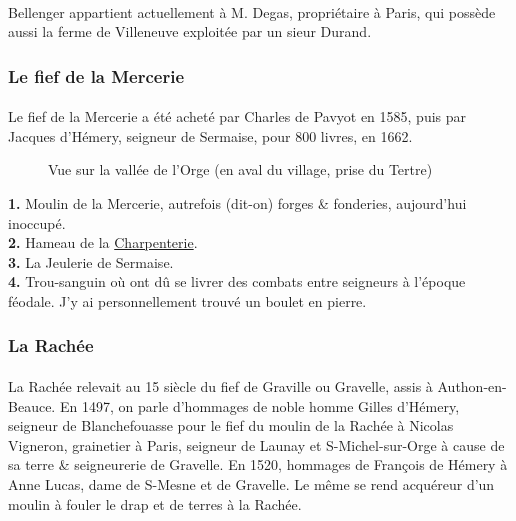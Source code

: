 \documentclass[../eBook.tex]{subfiles}
\begin{document}
      \paragraph{}Bellenger appartient actuellement à M. Degas, propriétaire à Paris, qui possède aussi la ferme de Villeneuve exploitée par un sieur Durand.

    \subsubsection*{Le fief de la Mercerie}
      \paragraph{}Le fief de la Mercerie a été acheté par Charles de Pavyot en 1585, puis par Jacques d'Hémery, seigneur de Sermaise, pour 800 livres, en 1662.
      \newpage
      \begin{center}
        \begin{figure}[!ht]
          \caption*{Vue sur la vallée de l'Orge (en aval du village, prise du Tertre)}
        \end{figure}
      \end{center}
      \small{}
      \noindent\textbf{1.} Moulin de la Mercerie, autrefois (dit-on) forges \& fonderies, aujourd'hui inoccupé.\\
      \textbf{2.} Hameau de la \underline{Charpenterie}.\\
      \textbf{3.} La Jeulerie de Sermaise.\\
      \textbf{4.} Trou-sanguin où ont dû se livrer des combats entre seigneurs à l'époque féodale. J'y ai personnellement trouvé un boulet en pierre.
      \normalsize{}

    \subsubsection*{La Rachée}
      \paragraph{}La Rachée relevait au 15 siècle du fief de Graville ou Gravelle, assis à Authon-en-Beauce. En 1497, on parle d'hommages de noble homme Gilles d'Hémery, seigneur de Blanchefouasse pour le fief du moulin de la Rachée à Nicolas Vigneron, grainetier à Paris, seigneur de Launay et S-Michel-sur-Orge à cause de sa terre \& seigneurerie de Gravelle. En 1520, hommages de François de Hémery à Anne Lucas, dame de S-Mesne et de Gravelle. Le même se rend acquéreur d'un moulin à fouler le drap et de terres à la Rachée.
\end{document}
